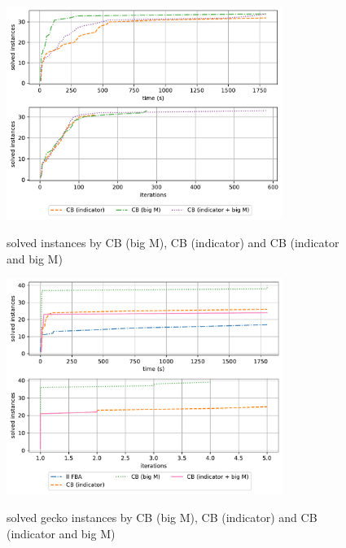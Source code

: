 

\begin{figure}[h!]
    \caption{solved instances by CB (big M), CB (indicator) and CB (indicator and big M)}
    \centering
    \includegraphics[width=0.8\textwidth]{Images/comparison_solved_instances_indicator_and_big_m.pdf}
    \label{fig:comparison_solved_instances_indicator_and_big_m_as_MP}
\end{figure}

\begin{figure}[h!]
    \caption{solved gecko instances by CB (big M), CB (indicator) and CB (indicator and big M)}
    \centering
    \includegraphics[width=0.8\textwidth]{Images/comparison_solved_instances_gecko_1.0e-8_indicator_and_big_m.pdf}
    \label{fig:comparison_solved_instances_gecko_1.0e-8_indicator_and_big_m_as_MP}
\end{figure}


\newpage
\restoreapp